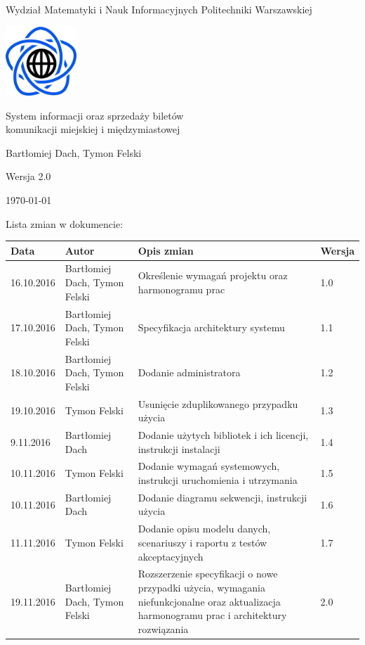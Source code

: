 \documentclass[10pt,a4paper]{article}
\begin{document}
\begin{titlepage}
	\centering
	{\Large Wydział Matematyki i Nauk Informacyjnych Politechniki Warszawskiej \par}
	\vspace{1cm}
	\includegraphics[width=0.2\textwidth]{logo.png} \par
	\vspace{5cm}
	{\LARGE System informacji oraz sprzedaży biletów\\komunikacji miejskiej i międzymiastowej \par}
	\vspace{0.5cm}
	{\Large Bartłomiej Dach, Tymon Felski \par}
	\vspace{1.5cm}
	{\Large Wersja 2.0 \par}
	\vspace{1.5cm}
	{\Large \today \par}
\end{titlepage}
Lista zmian w dokumencie:
\begin{table}[H]
\def\arraystretch{1.5}
\begin{tabularx}{\textwidth}{|l|l|X|l|}
	\hline
	\textbf{Data} & \textbf{Autor} & \textbf{Opis zmian} & \textbf{Wersja} \\
	\hline
	16.10.2016 & Bartłomiej Dach, Tymon Felski & Określenie wymagań projektu oraz harmonogramu prac & 1.0 \\
	\hline
	17.10.2016 & Bartłomiej Dach, Tymon Felski & Specyfikacja architektury systemu & 1.1 \\
	\hline
	18.10.2016 & Bartłomiej Dach, Tymon Felski & Dodanie administratora & 1.2 \\
	\hline
	19.10.2016 & Tymon Felski & Usunięcie zduplikowanego przypadku użycia & 1.3 \\
	\hline
	9.11.2016 & Bartłomiej Dach & Dodanie użytych bibliotek i ich licencji, instrukcji instalacji & 1.4 \\
	\hline
	10.11.2016 & Tymon Felski & Dodanie wymagań systemowych, instrukcji uruchomienia i utrzymania & 1.5 \\
	\hline
	10.11.2016 & Bartłomiej Dach & Dodanie diagramu sekwencji, instrukcji użycia & 1.6 \\
	\hline
	11.11.2016 & Tymon Felski & Dodanie opisu modelu danych, scenariuszy i raportu z testów akceptacyjnych & 1.7 \\
	\hline
	19.11.2016 & Bartłomiej Dach, Tymon Felski & Rozszerzenie specyfikacji o nowe przypadki użycia, wymagania niefunkcjonalne oraz aktualizacja harmonogramu prac i architektury rozwiązania & 2.0 \\
	\hline
\end{tabularx}
\end{table}
\end{document}
